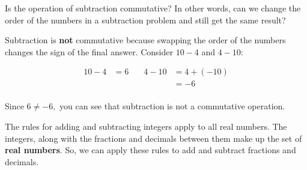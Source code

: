 \documentclass[font=12pt, handout]{ximera}
\begin{document}
\begin{problem}
Is the operation of subtraction commutative?  In other words, can we change the order of the numbers in a subtraction problem and still get the same result?

\begin{multipleChoice}
\end{multipleChoice}

\begin{feedback}
Subtraction is \textbf{not} commutative because swapping the order of the numbers changes the sign of the final answer.  
Consider $10-4$ and $4-10:$

\begin{align*}
  10 - 4 & = 6    & \quad 4 - 10 &= 4 + (-10) \\
         &          &             &= -6 \\
\end{align*} 

Since $6 \neq -6,$ you can see that subtraction is not a commutative operation.
\end{feedback}
\end{problem}

\begin{remark}
    The rules for adding and subtracting integers apply to all real numbers. The integers, along with the fractions and 
    decimals between them make up the set of \textbf{real numbers}.  So, we can apply these rules to add and subtract fractions 
    and decimals.   
\end{remark}
\end{document}
